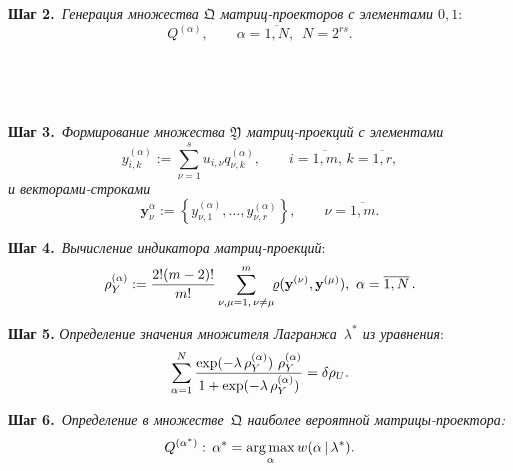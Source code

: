 \begin{multicols}{2}
\noindent
\textbf{Шаг 2.}\ \textit{Генерация множества $\mathfrak{Q}$ мат\-риц-про\-ек\-то\-ров с 
элементами $0,1$}:
$$
Q^{(\alpha)},\qquad \alpha = \overline{1,N},\,\,\,N = 2^{rs}.
$$

\begin{figure*} %
\vspace*{1pt}
\begin{minipage}[t]{80mm}
    \begin{center}  
  \mbox{%
 \epsfxsize=78.264mm 
 }
\end{center}
\vspace*{-11pt}
\label{fig1a}
\end{minipage}
\hfill
\vspace*{1pt}
\begin{minipage}[t]{80mm}
    \begin{center}  
  \mbox{%
 \epsfxsize=78.952mm 
 }
\end{center}
\vspace*{-11pt}
\label{fig1b}
\end{minipage}
\vspace*{6pt}
\end{figure*}

\noindent
\textbf{Шаг 3.}\ \textit{Формирование множества $\mathfrak{Y}$ мат\-риц-про\-ек\-ций с 
элементами}
$$
y^{(\alpha)}_{i,k} := \sum\limits^s_{\nu=1} u_{i,\nu} 
q^{(\alpha)}_{\nu,k},\qquad i = \overline{1,m},\,k = \overline{1,r},
$$
\textit{и векторами-строками}
$$
\mathbf{y}^{\alpha}_{\nu} := \left\{y^{(\alpha)}_{\nu,1}, \dots, 
y^{(\alpha)}_{\nu,r} \right\},\qquad \nu = \overline{1,m}.
$$

\noindent
\textbf{Шаг 4.}\ \textit{Вычисление индикатора мат\-риц-про\-ек\-ций}:
$$
\rho^{(\alpha)}_Y := \displaystyle\frac{\displaystyle 2!(m-2)!\mathstrut}{\displaystyle m!\mathstrut} \sum\limits^m_{\nu, \mu = 1,\,\nu \ne 
\mu} \!\!\varrho(\mathbf{y}^{(\nu)}, \mathbf{y}^{(\mu)}), \ \alpha = 
\overline{1,N}\,.
$$

\noindent
\textbf{Шаг 5.} \textit{Определение значения множителя Лагранжа~$\lambda^*$ из 
уравнения}:
$$
\sum\limits^N_{\alpha=1}\displaystyle\frac{\displaystyle \exp(- \lambda\, \rho^{(\alpha)}_Y)\,\, 
\rho^{(\alpha)}_Y\mathstrut}{\displaystyle 1 + \exp(- \lambda\,\rho^{(\alpha)}_Y)\mathstrut} = \delta \rho_U.
$$

\noindent
\textbf{Шаг 6.}\  \textit{Определение в множестве~$\mathfrak{Q}$ наиболее вероятной 
мат\-ри\-цы-про\-ек\-тора:}
$$
Q^{(\alpha^*)}: \,\alpha^* = \mathop{\mathrm{arg}\,\mathrm{max}}\limits_{\alpha} w(\alpha\,|\,\lambda^*).
$$


\end{multicols}
